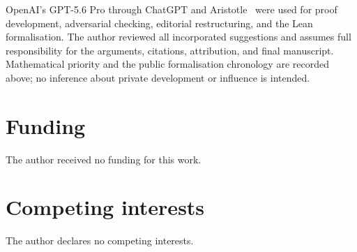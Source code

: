 \documentclass[a4paper,11pt,reqno]{amsart}
\theoremstyle{plain}
\theoremstyle{definition}
\theoremstyle{remark}
\begin{document}
OpenAI's GPT-5.6 Pro through ChatGPT and Aristotle~\citep{achim-et-al-2025}
were used for proof development, adversarial checking, editorial restructuring,
and the Lean formalisation.  The author reviewed all incorporated suggestions
and assumes full responsibility for the arguments, citations, attribution, and
final manuscript.  Mathematical priority and the public formalisation
chronology are recorded above; no inference about private development or
influence is intended.

\section*{Funding}
The author received no funding for this work.

\section*{Competing interests}
The author declares no competing interests.
\end{document}
